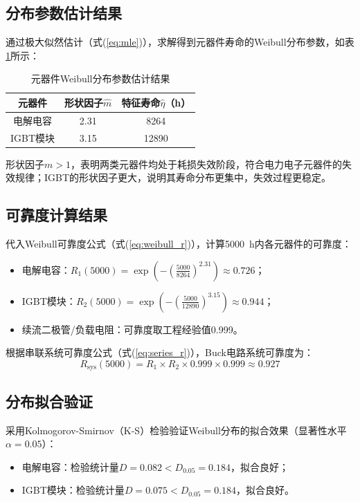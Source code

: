 \documentclass[12pt]{article}
\begin{document}
\subsection{分布参数估计结果}
通过极大似然估计（式(\ref{eq:mle})），求解得到元器件寿命的Weibull分布参数，如表\ref{tab:weibull_params}所示：

\begin{table}[!htbp]
\centering
\caption{元器件Weibull分布参数估计结果}
\label{tab:weibull_params}
\begin{tabular}{c|cc}
\toprule
元器件 & 形状因子$\hat{m}$ & 特征寿命$\hat{\eta}$（\si{\hour}） \\
\midrule
电解电容 & 2.31 & 8264 \\
IGBT模块 & 3.15 & 12890 \\
\bottomrule
\end{tabular}
\end{table}

形状因子$m>1$，表明两类元器件均处于耗损失效阶段，符合电力电子元器件的失效规律；IGBT的形状因子更大，说明其寿命分布更集中，失效过程更稳定。

\subsection{可靠度计算结果}
代入Weibull可靠度公式（式(\ref{eq:weibull_r})），计算\SI{5000}{\hour}内各元器件的可靠度：
\begin{itemize}
    \item 电解电容：$R_1(5000) = \exp\!\left(-\left( \frac{5000}{8264} \right)^{2.31}\right) \approx 0.726$；
    \item IGBT模块：$R_2(5000) = \exp\!\left(-\left( \frac{5000}{12890} \right)^{3.15}\right) \approx 0.944$；
    \item 续流二极管/负载电阻：可靠度取工程经验值0.999。
\end{itemize}

根据串联系统可靠度公式（式(\ref{eq:series_r})），Buck电路系统可靠度为：
\[
R_{\text{sys}}(5000) = R_1 \times R_2 \times 0.999 \times 0.999 \approx 0.927
\]

\subsection{分布拟合验证}
采用Kolmogorov-Smirnov（K-S）检验验证Weibull分布的拟合效果（显著性水平$\alpha=0.05$）：
\begin{itemize}
    \item 电解电容：检验统计量$D=0.082 < D_{0.05}=0.184$，拟合良好；
    \item IGBT模块：检验统计量$D=0.075 < D_{0.05}=0.184$，拟合良好。
\end{itemize}
\end{document}
